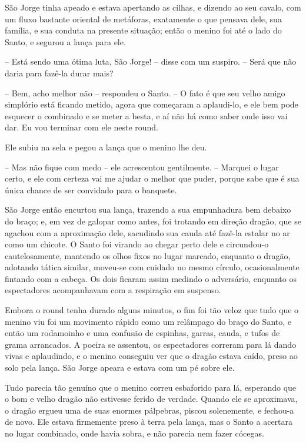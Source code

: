 São Jorge tinha apeado e estava apertando as cilhas, e dizendo ao seu
cavalo, com um fluxo bastante oriental de metáforas, exatamente o que
pensava dele, sua família, e sua conduta na presente situação; então
o menino foi até o lado do Santo, e segurou a lança para ele.

-- Está sendo uma ótima luta, São Jorge! -- disse com um suspiro. -- Será
que não daria para fazê-la durar mais? 

-- Bem, acho melhor não -- respondeu o Santo. -- O fato é que seu velho
amigo simplório está ficando metido, agora que começaram a
aplaudi-lo, e ele bem pode esquecer o combinado e se meter a besta, e
aí não há como saber onde isso vai dar. Eu vou terminar com ele neste
round.

Ele subiu na sela e pegou a lança que o menino lhe deu.

-- Mas não fique com medo -- ele acrescentou gentilmente. -- Marquei o
lugar certo, e ele com certeza vai me ajudar o melhor que puder,
porque sabe que é sua única chance de ser convidado para o banquete.

São Jorge então encurtou sua lança, trazendo a sua empunhadura bem
debaixo do braço; e, em vez de galopar como antes, foi trotando em
direção dragão, que se agachou com a aproximação dele, sacudindo sua
cauda até fazê-la estalar no ar como um chicote. O Santo foi virando
ao chegar perto dele e circundou-o cautelosamente, mantendo os olhos
fixos no lugar marcado, enquanto o dragão, adotando tática similar,
moveu-se com cuidado no mesmo círculo, ocasionalmente fintando com a
cabeça. Os dois ficaram assim medindo o adversário, enquanto os
espectadores acompanhavam com a respiração em suspenso.

Embora o round tenha durado alguns minutos, o fim foi tão veloz que
tudo que o menino viu foi um movimento rápido como um relâmpago do
braço do Santo, e então um rodamoinho e uma confusão de espinhas,
garras, cauda, e tufos de grama arrancados. A poeira se assentou, os
espectadores correram para lá dando vivas e aplaudindo, e o menino
conseguiu ver que o dragão estava caído, preso ao solo pela lança.
São Jorge apeara e estava com um pé sobre ele.

Tudo parecia tão genuíno que o menino correu esbaforido para lá,
esperando que o bom e velho dragão não estivesse ferido de verdade.
Quando ele se aproximava, o dragão ergueu uma de suas enormes
pálpebras, piscou solenemente, e fechou-a de novo. Ele estava
firmemente preso à terra pela lança, mas o Santo a acertara no lugar
combinado, onde havia sobra, e não parecia nem fazer cócegas.

